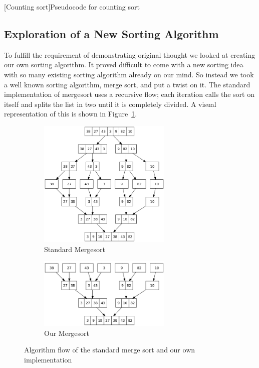 \documentclass[12pt]{article}
\begin{document}
	
	\begin{center}
		[Counting sort]{Pseudocode for counting sort}
		
		\label{snip:countsort}
	\end{center}
	
	\subsection{Exploration of a New Sorting Algorithm}
	
	To fulfill the requirement of demonstrating original thought we looked at creating our own sorting algorithm.
	It proved difficult to come with a new sorting idea with so many existing sorting algorithm already on our mind.
	So instead we took a well known sorting algorithm, merge sort, and put a twist on it.
	The standard implementation of mergesort uses a recursive flow; each iteration calls the sort on itself and splits the list in two until it is completely divided.
	A visual representation of this is shown in Figure~\ref{fig:stdmerge}.
	
	
\begin{figure}[H]
	
	\begin{subfigure}{0.49\textwidth}
		\includegraphics[width=2.5in]{Merge_sort_algorithm_diagram.png} 
		\caption{Standard Mergesort}
		\label{fig:stdmerge}
	\end{subfigure}
	\begin{subfigure}{0.49\textwidth}
		\includegraphics[width=2.5in]{New_merge_sort_algorithm_diagram.png}
		\caption{Our Mergesort}
		\label{fig:newmerge}
	\end{subfigure}
	
	\caption{Algorithm flow of the standard merge sort and our own implementation}
	\label{fig:bothmerge}
\end{figure}
	
\end{document}
